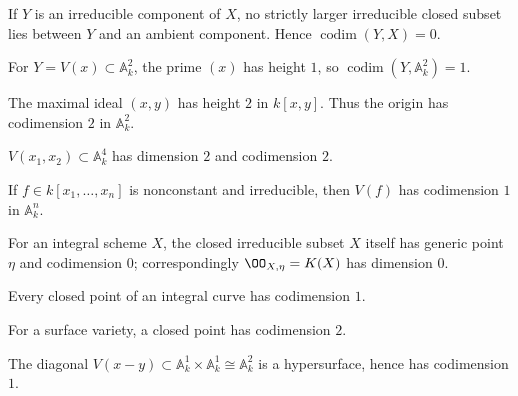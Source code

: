 \begin{example}\label{ex:vi31-01}
If $Y$ is an irreducible component of $X$, no strictly larger irreducible closed subset lies between $Y$ and an ambient component. Hence $\operatorname{codim}(Y,X)=0$.
\end{example}

\begin{example}\label{ex:vi31-02}
For $Y=V(x)\subset\mathbb A^2_k$, the prime $(x)$ has height $1$, so $\operatorname{codim}(Y,\mathbb A^2_k)=1$.
\end{example}

\begin{example}\label{ex:vi31-03}
The maximal ideal $(x,y)$ has height $2$ in $k[x,y]$. Thus the origin has codimension $2$ in $\mathbb A^2_k$.
\end{example}

\begin{example}\label{ex:vi31-04}
$V(x_1,x_2)\subset\mathbb A^4_k$ has dimension $2$ and codimension $2$.
\end{example}

\begin{example}[A hypersurface]\label{ex:vi31-05}
If $f\in k[x_1,\ldots,x_n]$ is nonconstant and irreducible, then $V(f)$ has codimension $1$ in $\mathbb A^n_k$.
\end{example}

\begin{example}\label{ex:vi31-06}
For an integral scheme $X$, the closed irreducible subset $X$ itself has generic point $\eta$ and codimension $0$; correspondingly $\OO_{X,\eta}=K(X)$ has dimension $0$.
\end{example}

\begin{example}\label{ex:vi31-07}
Every closed point of an integral curve has codimension $1$.
\end{example}

\begin{example}\label{ex:vi31-08}
For a surface variety, a closed point has codimension $2$.
\end{example}

\begin{example}\label{ex:vi31-09}
The diagonal $V(x-y)\subset\mathbb A^1_k\times\mathbb A^1_k\cong\mathbb A^2_k$ is a hypersurface, hence has codimension $1$.
\end{example}

